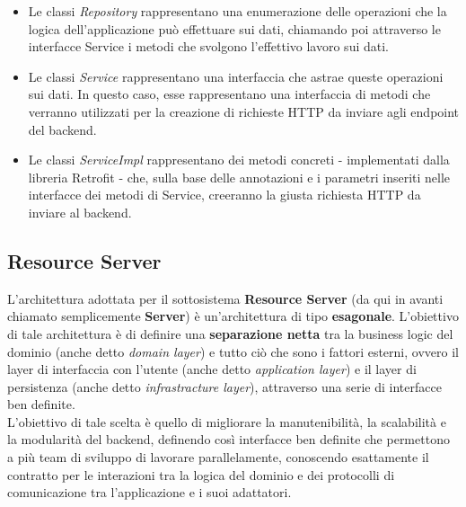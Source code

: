 \begin{itemize}
                    \begin{itemize}
                        \item Le classi \textit{Repository} rappresentano una enumerazione delle operazioni che la logica dell'applicazione può effettuare sui dati, chiamando poi attraverso le interfacce Service i metodi che svolgono l'effettivo lavoro sui dati.
                        \item Le classi \textit{Service} rappresentano una interfaccia che astrae queste operazioni sui dati. In questo caso, esse rappresentano una interfaccia di metodi che verranno utilizzati per la creazione di richieste HTTP da inviare agli endpoint del backend.
                        \item Le classi \textit{ServiceImpl} rappresentano dei metodi concreti - implementati dalla libreria Retrofit - che, sulla base delle annotazioni e i parametri inseriti nelle interfacce dei metodi di Service, creeranno la giusta richiesta HTTP da inviare al backend.
                    \end{itemize}
            \end{itemize}
    
        \subsection{Resource Server}
            L'architettura adottata per il sottosistema \textbf{Resource Server} (da qui in avanti chiamato semplicemente \textbf{Server}) è un'architettura di tipo \textbf{esagonale}. L'obiettivo di tale architettura è di definire una \textbf{separazione netta} tra la business logic del dominio (anche detto \textit{domain layer}) e tutto ciò che sono i fattori esterni, ovvero il layer di interfaccia con l'utente (anche detto \textit{application layer}) e il layer di persistenza (anche detto \textit{infrastracture layer}), attraverso una serie di interfacce ben definite. \\
            L'obiettivo di tale scelta è quello di migliorare la manutenibilità, la scalabilità e la modularità del backend, definendo così interfacce ben definite che permettono a più team di sviluppo di lavorare parallelamente, conoscendo esattamente il contratto per le interazioni tra la logica del dominio e dei protocolli di comunicazione tra l'applicazione e i suoi adattatori. \cite{AppMaster1}
            

